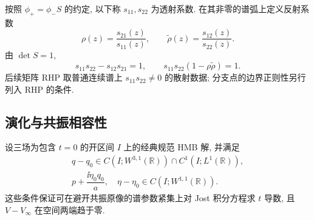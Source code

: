 按照 $\phi_+=\phi_-S$ 的约定, 以下称 $s_{11},s_{22}$ 为透射系数. 在其非零的谱弧上定义反射系数
\begin{equation}\label{eq:reflection}
\rho(z)=\dfrac{s_{21}(z)}{s_{11}(z)},\qquad
\widetilde\rho(z)=\dfrac{s_{12}(z)}{s_{22}(z)}.
\end{equation}
由 $\det S=1$,
\begin{equation}\label{eq:scattering-determinant}
s_{11}s_{22}-s_{12}s_{21}=1,\qquad
s_{11}s_{22}(1-\rho\widetilde\rho)=1.
\end{equation}
后续矩阵 RHP 取普通连续谱上 $s_{11}s_{22}\ne0$ 的散射数据; 分支点的边界正则性另行列入 RHP 的条件.

\subsection{演化与共振相容性}
设三场为包含 $t=0$ 的开区间 $I$ 上的经典规范 HMB 解, 并满足
\begin{equation}\label{eq:evolution-regularity}
\begin{gathered}
q-q_0\in C(I;W^{3,1}(\mathbb R))\cap C^1(I;L^1(\mathbb R)),\\
p+\dfrac{\ii\eta_0q_0}{a},\quad\eta-\eta_0\in C(I;W^{1,1}(\mathbb R)).
\end{gathered}
\end{equation}
这些条件保证可在避开共振原像的谱参数紧集上对 Jost 积分方程求 $t$ 导数, 且 $V-V_\infty$ 在空间两端趋于零.


